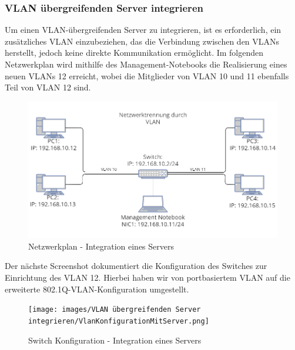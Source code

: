         \newpage
        \subsubsection{VLAN übergreifenden Server integrieren}
        Um einen VLAN-übergreifenden Server zu integrieren, ist es erforderlich, ein zusätzliches VLAN einzubeziehen, 
        das die Verbindung zwischen den VLANs herstellt, jedoch keine direkte Kommunikation ermöglicht. Im folgenden Netzwerkplan 
        wird mithilfe des Management-Notebooks die Realisierung eines neuen VLANs 12 erreicht, wobei die Mitglieder von VLAN 10 und 11 
        ebenfalls Teil von VLAN 12 sind.
        \begin{figure}[H]
            \centering
            \includegraphics[width=\linewidth]{images/Trennung durch VLAN herstellen/Netzwerkplan_VLAN._portbasiert.png}
            \caption{Netzwerkplan - Integration eines Servers}
        \end{figure}
        Der nächste Screenshot dokumentiert die Konfiguration des Switches zur Einrichtung des VLAN 12.
        Hierbei haben wir von portbasiertem VLAN auf die erweiterte 802.1Q-VLAN-Konfiguration umgestellt.
        \begin{figure}[H]
            \centering
            \texttt{[image: images/VLAN übergreifenden Server integrieren/VlanKonfigurationMitServer.png]}
            \caption{Switch Konfiguration - Integration eines Servers}
        \end{figure}
